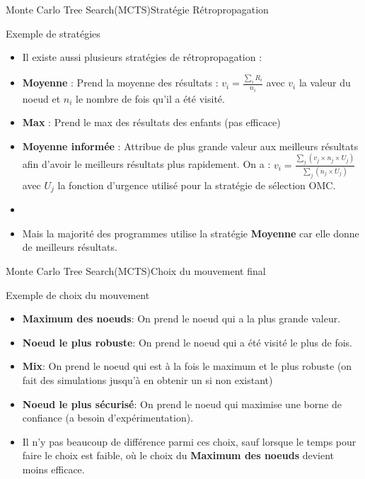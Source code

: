 \begin{frame}{Monte Carlo Tree Search(MCTS)}{Stratégie Rétropropagation}
	\begin{block}{Exemple de stratégies}
		\begin{itemize}
			\item Il existe aussi plusieurs stratégies de rétropropagation :
			\item \textbf{Moyenne} : Prend la moyenne des résultats : $v_{i} = \frac{\sum_{i}^{}R_{i}}{n_{i}}$ avec $v_{i}$ la valeur du noeud et $n_i$ le nombre de fois qu'il a été visité.
			\item \textbf{Max} : Prend le max des résultats des enfants (pas efficace)
			\item \textbf{Moyenne informée} : Attribue de plus grande valeur aux meilleurs résultats afin d'avoir le meilleurs résultats plus rapidement.
			      On a : $v_{i} = \frac{\sum_{j}^{}(v_{j}\times n_{j}\times U_{j})}{\sum_{j}^{}(n_{j}\times U_{j})}$ avec $U_{j}$ la fonction d'urgence utilisé pour la stratégie de sélection OMC.
			\item \
			\item Mais la majorité des programmes utilise la stratégie \textbf{Moyenne} car elle donne de meilleurs résultats.
		\end{itemize}
	\end{block}
\end{frame}

\begin{frame}{Monte Carlo Tree Search(MCTS)}{Choix du mouvement final}
	\begin{block}{Exemple de choix du mouvement}
		\begin{itemize}
			\item \textbf{Maximum des noeuds}: On prend le noeud qui a la plus grande valeur.
			\item \textbf{Noeud le plus robuste}: On prend le noeud qui a été visité le plus de fois.
			\item \textbf{Mix}: On prend le noeud qui est à la fois le maximum et le plus robuste (on fait des simulations jusqu'à en obtenir un si non existant)
			\item \textbf{Noeud le plus sécurisé}: On prend le noeud qui maximise une borne de confiance (a besoin d'expérimentation).
			\item Il n'y pas beaucoup de différence parmi ces choix, sauf lorsque le temps pour faire le choix est faible, où le choix du \textbf{Maximum des noeuds} devient moins efficace.
		\end{itemize}
	\end{block}
\end{frame}

